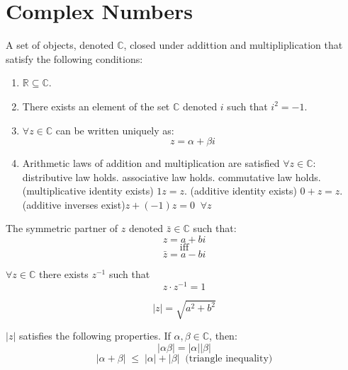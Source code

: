 \section{Complex Numbers}

\begin{defn}
	A set of objects, denoted $\mathbb{C}$, closed under addittion and multipliplication that satisfy the following conditions:
	\begin{enumerate}
		\item $\mathbb{R} \subseteq \mathbb{C}$.
		\item There exists an element of the set $\mathbb{C}$ denoted $i$ such that $i^2 = -1$.
		\item $\forall z \in \mathbb{C}$ can be written uniquely as: \[z = \alpha + \beta i \]
		\item Arithmetic laws of addition and multiplication are satisfied $\forall z \in \mathbb{C}$:
		\subitem distributive law holds.
		\subitem associative law holds.
		\subitem commutative law holds.
		\subitem (multiplicative identity exists) $1z = z.$
		\subitem (additive identity exists) $0 + z = z.$
		\subitem (additive inverses exist)$z + (-1)z = 0 \;\; \forall z$
	\end{enumerate}
\end{defn}
\begin{defn}
	The symmetric partner of $z$ denoted $\bar{z} \in \mathbb{C}$ such that: 
	\[ z = a + bi\] \[\text{iff}\] \[\bar{z} = a - bi \]
\end{defn}
\begin{defn}
	$\forall z \in \mathbb{C}$ there exists $z^{-1}$ such that \[z\cdot z^{-1} = 1\]
\end{defn}
\begin{defn}
	\[|z| = \sqrt{a^2 + b^2}\]
\end{defn}
\begin{thm}
	$|z|$ satisfies the following properties. If $\alpha, \beta \in \mathbb{C}$, then:
	\[|\alpha\beta| = |\alpha||\beta|\]
	\[|\alpha + \beta| \;\leq\; |\alpha| + |\beta| \;\;\text{(triangle inequality)}\]
\end{thm}
\newpage